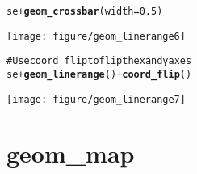 \documentclass[a4paper,titlepage]{tufte-handout}\usepackage{graphicx, color}
\makeatletter
\def\maxwidth{ %
  \ifdim\Gin@nat@width>\linewidth
    \linewidth
  \else
    \Gin@nat@width
  \fi
}
\newcommand{\hlfunctioncall}[1]{\textcolor[rgb]{0.501960784313725,0,0.329411764705882}{\textbf{#1}}}%
\newcommand{\hlcomment}[1]{\textcolor[rgb]{0.180392156862745,0.6,0.341176470588235}{#1}}%
\newenvironment{kframe}{%
 \def\at@end@of@kframe{}%
 \ifinner\ifhmode%
  \def\at@end@of@kframe{\end{minipage}}%
  \begin{minipage}{\columnwidth}%
 \fi\fi%
 \def\FrameCommand##1{\hskip\@totalleftmargin \hskip-\fboxsep
 \colorbox{shadecolor}{##1}\hskip-\fboxsep
     \hskip-\linewidth \hskip-\@totalleftmargin \hskip\columnwidth}%
 \MakeFramed {\advance\hsize-\width
   \@totalleftmargin\z@ \linewidth\hsize
   \@setminipage}}%
 {\par\unskip\endMakeFramed%
 \at@end@of@kframe}
\newenvironment{knitrout}{}{} %
\makeatother
\begin{document}
\begin{knitrout}
\begin{kframe}
\begin{alltt}
se + \hlfunctioncall{geom_crossbar}(width = 0.5)
\end{alltt}
\end{kframe}\texttt{[image: figure/geom\_linerange6]} \begin{kframe}\begin{alltt}
\hlcomment{# Use coord_flip to flip the x and y axes}
se + \hlfunctioncall{geom_linerange}() + \hlfunctioncall{coord_flip}()
\end{alltt}
\end{kframe}\texttt{[image: figure/geom\_linerange7]} 
\end{knitrout}


\section{geom\_map}
\end{document}
